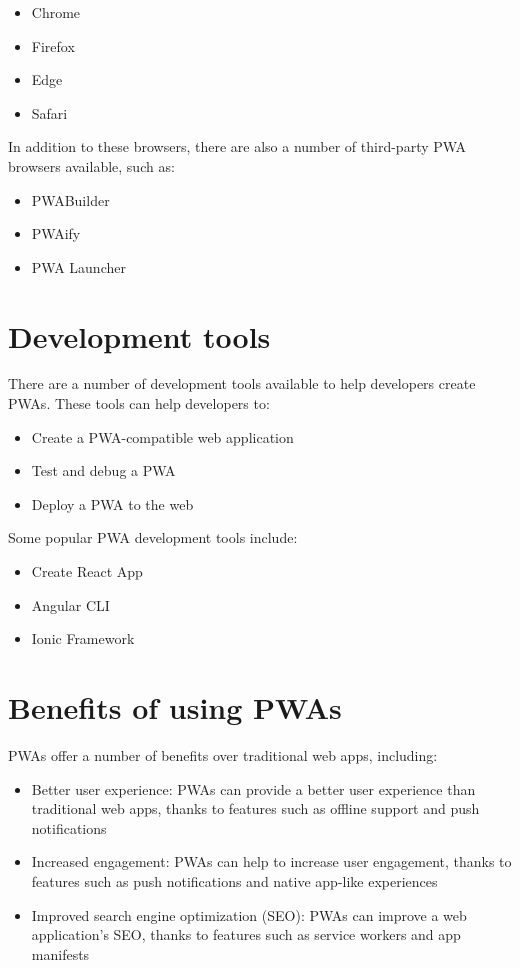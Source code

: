 \documentclass{report}
\begin{document}
\begin{itemize}
    \item Chrome
    \item Firefox
    \item Edge
    \item Safari
\end{itemize}
In addition to these browsers, there are also a number of third-party PWA browsers available, such as: 

\begin{itemize}
    \item PWABuilder
    \item PWAify
    \item PWA Launcher
\end{itemize}

\section{Development tools}\label{Development tools}

There are a number of development tools available to help developers create PWAs. These tools can help developers to: \cite{w3c23}

\begin{itemize}
    \item Create a PWA-compatible web application
    \item Test and debug a PWA
    \item Deploy a PWA to the web
\end{itemize}

Some popular PWA development tools include: 
\begin{itemize}
    \item Create React App
    \item Angular CLI
    \item Ionic Framework
\end{itemize}

\section{Benefits of using PWAs}\label{Benefits of using PWAs}
PWAs offer a number of benefits over traditional web apps, including: \cite{google23}

\begin{itemize}
    \item Better user experience: PWAs can provide a better user experience than traditional web apps, thanks to features such as offline support and push notifications
    \item Increased engagement: PWAs can help to increase user engagement, thanks to features such as push notifications and native app-like experiences
    \item Improved search engine optimization (SEO): PWAs can improve a web application's SEO, thanks to features such as service workers and app manifests
\end{itemize}
\end{document}
